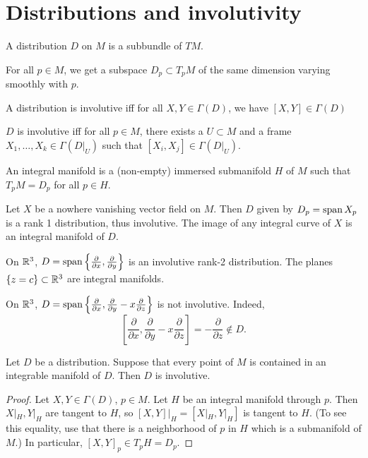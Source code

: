 \section{Distributions and involutivity}
 \begin{definition}[Distribution]
    A distribution $D$ on $M$ is a subbundle of $TM$.
  \end{definition}
    For all $p \in  M$, we get a subspace $D_p \subset T_pM$ of the same dimension varying smoothly with $p$.

\begin{definition}
    A distribution is involutive iff for all $X, Y \in \Gamma(D)$, we have $[X, Y] \in \Gamma(D)$
\end{definition}
\begin{remark}
    $D$ is involutive iff for all $p \in M$, there exists a $U \subset M$ and a frame $X_1, \ldots, X_k \in \Gamma(D|_U)$ such that $[X_i, X_j] \in \Gamma(D|_U)$.
\end{remark}
\begin{definition}
    An integral manifold is a (non-empty) immersed submanifold $H$ of  $M$ such that  $T_p M = D_p$ for all  $p \in H$.
    
\end{definition}

\begin{eg}
    Let $X$ be a nowhere vanishing vector field on $M$.
    Then $D$ given by $D_p = \operatorname{span} X_p$ is a rank 1 distribution, thus involutive.
    The image of any integral curve of $X$ is an integral manifold of $D$.
\end{eg}
\begin{eg}
On $\mathbb{R}^3$, $D = \operatorname{span} \left\{\frac{\partial }{\partial x} , \frac{\partial }{\partial y}\right\}$ is an involutive rank-2 distribution. The planes $\{z = c\} \subset \mathbb{R}^3$ are integral manifolds.
\end{eg}
\begin{eg}
    On $\mathbb{R}^3$, $D = \operatorname{span} \left\{\frac{\partial }{\partial x} , \frac{\partial }{\partial y}  - x \frac{\partial }{\partial z} \right\} $ is not involutive. Indeed, 
    \[\left[ \frac{\partial }{\partial x} , \frac{\partial }{\partial y}  - x \frac{\partial }{\partial z} \right] = - \frac{\partial }{\partial z}  \not\in D.\]
   \end{eg}
\begin{prop}\label{prop:intinv}
    Let $D$ be a distribution. Suppose that every point of $M$ is contained in an integrable manifold of $D$.
    Then $D$ is involutive.
\end{prop}
\begin{proof}
    Let $X, Y \in \Gamma(D)$, $p \in M$.
    Let $H$ be an integral manifold through $p$.
    Then $X|_H, Y|_H$ are tangent to  $H$, so $[X, Y]|_H = [X|_H, Y|_H]$ is tangent to  $H$. (To see this equality, use that there is a neighborhood of $p$ in $H$ which is a submanifold of $M$.)
    In particular, $[X, Y]_p \in T_pH = D_p$.
\end{proof}
